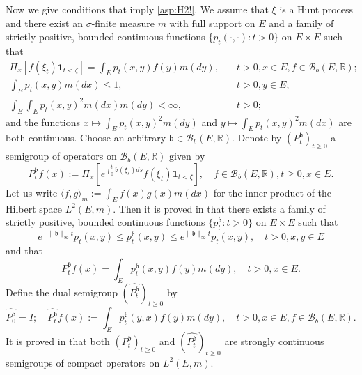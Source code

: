\documentclass[12pt,a4paper]{amsart}
\numberwithin{equation}{section}
\theoremstyle{plain}
\theoremstyle{definition}
\theoremstyle{remark}
\begin{document}
	Now we give conditions that imply \eqref{asp:H2!}.
	We assume that $\xi$ is a Hunt process and there exist an $\sigma$-finite measure $m$ with full support on $E$ and a family of strictly positive, bounded
    continuous functions $\{p_t(\cdot,\cdot): t>0\}$ on $E\times E$ such that
\begin{align}
	\Pi_x[f(\xi_t) \mathbf 1_{t< \zeta}] = \int_E p_t(x,y) f(y)m(dy), & \quad t>0, x\in E, f\in \mathcal B_b(E,\mathbb R);
	\\ \int_E p_t(x,y) m(dx) \leq 1, &\quad t>0, y\in E;
	\\ \int_E \int_E p_t(x,y)^2 m(dx)m(dy) < \infty, &\quad t>0;
\end{align}
	and the functions $x \mapsto \int_E p_t(x,y)^2m(dy)$ and $y\mapsto \int_E p_t(x,y)^2m(dx)$ are both continuous.
	Choose an arbitrary $ \mathfrak b\in \mathcal B_b(E,\mathbb R)$.
	Denote by $(P_t^\mathfrak b)_{t\geq 0}$ a semigroup of operators on $\mathcal B_b(E,\mathbb R)$ given by
\begin{equation}
	P_t^\mathfrak b f(x)
	:= \Pi_x[e^{\int_0^t \mathfrak b(\xi_s)ds} f(\xi_t) \mathbf 1_{t< \zeta}],
	\quad f\in \mathcal B_b(E, \mathbb R), t\geq 0, x\in E.
\end{equation}
	Let us write $\langle f,g \rangle_m:= \int_E f(x)g(x) m(dx)$ for  the inner product of the Hilbert space $L^2(E,m)$.
	Then it is proved in \cite{RenSongZhang2015Limit, RenSongZhang2017Central} that there exists a family of strictly positive, bounded continuous functions
    $\{p_t^\mathfrak b: t> 0\}$ on $E\times E$ such that
\begin{equation} \label{eq:IU.0}
	e^{-\|\mathfrak b\|_\infty t} p_t(x,y)
	\leq p_t^\mathfrak b(x,y) \leq e^{\|\mathfrak b\|_\infty t}p_t(x,y),
	\quad t>0, x,y\in E
\end{equation}
	and that
\begin{equation}
	P_t^\mathfrak b f(x)
	= \int_E p_t^\mathfrak b(x,y) f(y) m(dy),
	\quad t>0, x\in E.
\end{equation}
	Define the dual semigroup $(\widehat {P^{\mathfrak b}_t} )_{t\geq 0}$ by
\begin{equation}
	\widehat {P_0^{\mathfrak b}}
	= I;
	\quad \widehat {P_t^{\mathfrak b}} f(x)
	:= \int_E p_t^\mathfrak b(y,x) f(y) m(dy),
	\quad t>0,x\in E, f\in \mathcal B_b(E,\mathbb R).
\end{equation}
	It is proved in \cite{RenSongZhang2015Limit, RenSongZhang2017Central} that both $(P_t^\mathfrak b)_{t\geq 0}$ and $(\widehat {P_t^\mathfrak b})_{t\geq 0}$
    are strongly continuous semigroups of compact operators on $L^2(E,m)$.	
\end{document}
